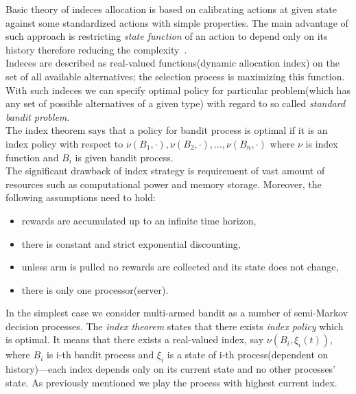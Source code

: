 \documentclass[12pt, a4paper, pdflatex, leqno]{report}
\begin{document}
Basic theory of indeces allocation is based on calibrating actions at given state against some standardized actions with simple properties. The main advantage of such approach is restricting \emph{state function} of an action to depend only on its history therefore reducing the complexity~\citep{gittins+glazebrook+weber}.\\

Indeces are described as real-valued functions(dynamic allocation index) on the set of all available alternatives; the selection process is maximizing this function.\\
With such indeces we can specify optimal policy for particular problem(which has any set of possible alternatives of a given type) with regard to so called \emph{standard bandit problem}.\\

The index theorem says that a policy for bandit process is optimal if it is an index policy with respect to $\nu(B_1, \cdot), \nu(B_2, \cdot),..., \nu(B_n, \cdot)$ where $\nu$ is index function and $B_i$ is given bandit process.\\

The significant drawback of index strategy is requirement of vast amount of resources such as computational power and memory storage. Moreover, the following assumptions need to hold:\\
\begin{itemize}
\item rewards are accumulated up to an infinite time horizon,
\item there is constant and strict exponential discounting,
\item unless arm is pulled no rewards are collected and its state does not change,
\item there is only one processor(server).\\
\end{itemize}

In the simplest case we consider multi-armed bandit as a number of semi-Markov decision processes. The \emph{index theorem} states that there exists \emph{index policy} which is optimal. It means that there exists a real-valued index, say $\nu ( B_i , \xi_i(t) )$, where $B_i$ is i-th bandit process and $\xi_i$ is a state of i-th process(dependent on history)---each index depends only on its current state and no other processes' state. As previously mentioned we play the process with highest current index.\\
\end{document}
